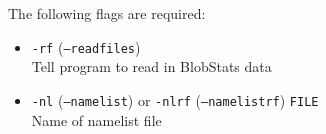 \documentclass{article}
\begin{document}
The following flags are required:
\begin{itemize}
\item[] \texttt{-rf} (\texttt{--readfiles}) \\ Tell program to read in BlobStats data
\item[]\texttt{-nl} (\texttt{--namelist}) or \texttt{-nlrf} (\texttt{--namelistrf}) \texttt{FILE}\\ Name of namelist file
\end{itemize}

%
%
%
%
\end{document}
